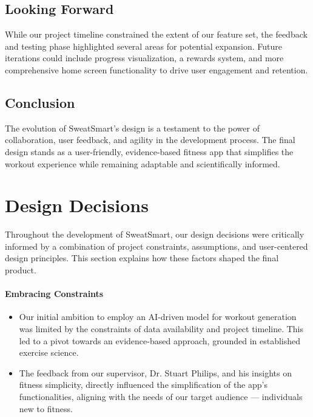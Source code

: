 \documentclass{article}
\begin{document}
\subsection{Looking Forward}
While our project timeline constrained the extent of our feature set, the feedback and testing phase highlighted several areas for potential expansion. Future iterations could include progress visualization, a rewards system, and more comprehensive home screen functionality to drive user engagement and retention.

\subsection{Conclusion}
The evolution of SweatSmart's design is a testament to the power of collaboration, user feedback, and agility in the development process. The final design stands as a user-friendly, evidence-based fitness app that simplifies the workout experience while remaining adaptable and scientifically informed.


\section{Design Decisions}

Throughout the development of SweatSmart, our design decisions were critically informed by a combination of project constraints, assumptions, and user-centered design principles. This section explains how these factors shaped the final product.

\paragraph{Embracing Constraints}
\begin{itemize}
    \item Our initial ambition to employ an AI-driven model for workout generation was limited by the constraints of data availability and project timeline. This led to a pivot towards an evidence-based approach, grounded in established exercise science.
    \item The feedback from our supervisor, Dr. Stuart Philips, and his insights on fitness simplicity, directly influenced the simplification of the app’s functionalities, aligning with the needs of our target audience — individuals new to fitness.
\end{itemize}
\end{document}
